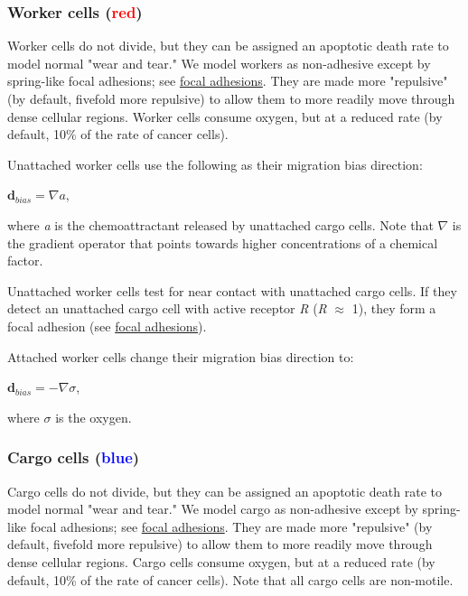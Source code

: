 \documentclass{article}
\begin{document}
\subsubsection{Worker cells (\textcolor{red}{red})}

Worker cells do not divide, but they can be assigned an apoptotic death
rate to model normal "wear and tear." We model workers as non-adhesive
except by spring-like focal adhesions; see
\protect\hyperlink{focal_adhesions}{focal adhesions}. They are made more
"repulsive" (by default, fivefold more repulsive) to allow them to more
readily move through dense cellular regions. Worker cells consume
oxygen, but at a reduced rate (by default, 10\% of the rate of cancer
cells).

{Unattached} worker cells use the following as their migration bias
direction:~

\begin{center}
$\mathbf{d}_{bias} = \nabla a$,
\end{center}

where \emph{a} is the chemoattractant released by unattached cargo
cells. Note that $\nabla$ is the gradient operator that points towards higher
concentrations of a chemical factor.

Unattached worker cells test for near contact with unattached cargo
cells. If they detect an unattached cargo cell with active receptor
\emph{R} (\emph{R} $\approx$ 1), they form a focal adhesion (see
\protect\hyperlink{focal_adhesions}{focal adhesions}).

{Attached} worker cells change their migration bias direction to:

\begin{center}
$\mathbf{d}_{bias} = - \nabla \sigma$,
\end{center}

where $\sigma$ is the oxygen.

\subsubsection{Cargo cells (\textcolor{blue}{blue})}\label{cargo-cells-blue}

Cargo cells do not divide, but they can be assigned an apoptotic death
rate to model normal "wear and tear." We model cargo as non-adhesive
except by spring-like focal adhesions; see
\protect\hyperlink{focal_adhesions}{focal adhesions}. They are made more
"repulsive" (by default, fivefold more repulsive) to allow them to more
readily move through dense cellular regions. Cargo cells consume oxygen,
but at a reduced rate (by default, 10\% of the rate of cancer cells).
Note that all cargo cells are non-motile.
\end{document}
